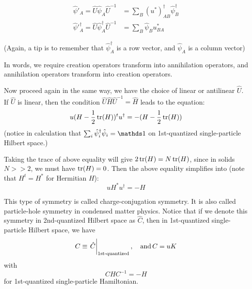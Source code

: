 \documentclass{article}
\begin{document}
\begin{align}
    \label{eq:sym-cc-1}
    \hat{\psi}'_A = 
    \hat{U} \hat\psi_A \hat{U}^{-1} &=
    \sum_B (u^*)^\dagger_{AB} \hat\psi^\dagger_B \\
    \label{eq:sym-cc-2}
    \hat\psi'^\dagger_A =
    \hat{U} \hat\psi^\dagger_A \hat{U}^{-1} &= 
    \sum_B  \hat\psi_B u^*_{BA}
\end{align}

(Again, a tip is to remember that $\hat\psi^\dagger_A$ is a row
vector, and $\hat\psi_A$ is a column vector)

In words, we require creation operators transform into annihilation
operators, and annihilation operators transform into creation
operators.

Now proceed again in the same way, we have the choice of linear or
antilinear $\hat{U}$. If $\hat{U}$ is linear, then the condition
$\hat{U}\hat{H}\hat{U}^{-1} = \hat{H}$ leads to the equation:
\begin{equation}
    \label{eq:sym-C-cond}
    u (H-\frac{1}{2}\tr(H))^t u^\dagger = - (H-\frac{1}{2}\tr(H))
\end{equation}
(notice in calculation that $\sum_i\hat\psi^\dagger_i \hat\psi_i =
\id$ on 1st-quantized single-particle Hilbert space.)

Taking the trace of above equality will give $2\tr(H)=N\tr(H)$, since
in solids $N>>2$, we must have $\tr(H)=0$. Then the above equality
simplifies into (note that $H^t = H^*$ for Hermitian $H$):
\begin{equation}
    u H^* u^\dagger = -H
\end{equation}

This type of symmetry is called charge-conjugation symmetry. It is
also called particle-hole symmetry in condensed matter physics. Notice
that if we denote this symmetry in 2nd-quantized Hilbert space as
$\hat{C}$, then in 1st-quantized single-particle Hilbert space, we
have
\begin{equation}
    C \equiv \eval{\hat{C}}_{\text{1st-quantized}}, \quad
    \text{and}\, C = uK
\end{equation}
with
\begin{equation}
    C H C^{-1} = -H
\end{equation}
for 1st-quantized single-particle Hamiltonian.
\end{document}
